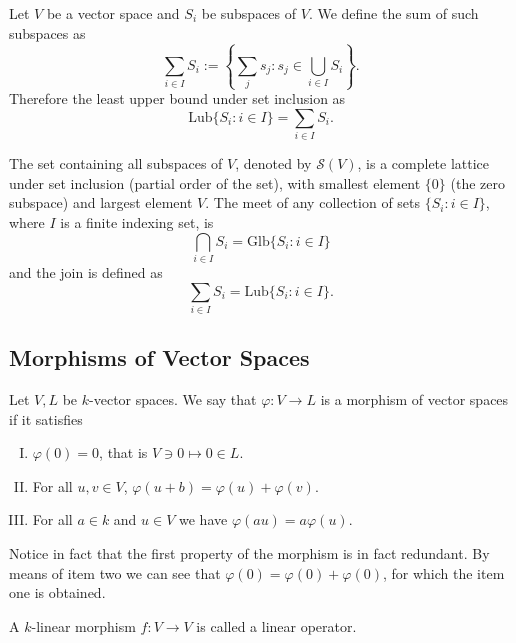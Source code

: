 \begin{definition}\label{def: sum of subspaces}
   Let \(V\) be a vector space and \(S_i\) be subspaces of \(V\). We define the
   sum of such subspaces as
   \[
      \sum_{i \in I} S_i := \left\{\sum_j s_j : s_j \in \bigcup_{i \in  I}
      S_i\right\}.
   \]
   Therefore the least upper bound under set inclusion as
   \[
      \mathrm{Lub}\{S_i : i \in I\} = \sum_{i \in I} S_i.
   \]
\end{definition}

\begin{theorem}\label{thm: subspaces form a lattice}
   The set containing all subspaces of \(V\), denoted by \(\mathcal{S}(V)\), is
   a complete lattice under set inclusion (partial order of the set), with
   smallest element \(\{0\}\) (the zero subspace) and largest element \(V\). The
   meet of any collection of sets \(\{S_i : i \in I\}\), where \(I\) is a finite
   indexing set, is
   \[
      \bigcap_{i \in  I} S_i = \mathrm{Glb}\{S_i : i \in I\}
   \]
   and the join is defined as
   \[
      \sum_{i \in I} S_i = \mathrm{Lub}\{S_i : i \in I\}.
   \]
\end{theorem}

\subsection{Morphisms of Vector Spaces}

\begin{definition}[Morphisms]\label{def: k-linear morphism}
   Let \(V, L\) be \(k\)-vector spaces. We say that \(\varphi : V \to L\) is a
   morphism of vector spaces if it satisfies
   \begin{enumerate}[I.]
      \item \(\varphi(0) = 0\), that is \(V \ni 0 \mapsto 0 \in L\).
      \item For all \(u, v \in V\), \(\varphi(u + b) = \varphi(u) +
         \varphi(v)\).
      \item For all \(a \in k\) and \(u \in V\) we have \(\varphi(au) =
         a\varphi(u)\).
   \end{enumerate}
\end{definition}

Notice in fact that the first property of the morphism is in fact redundant. By
means of item two we can see that \(\varphi(0) = \varphi(0) + \varphi(0)\), for
which the item one is obtained.

\begin{definition}\label{def: linear operator}
  A \(k\)-linear morphism \(f : V \to V\) is called a linear operator.
\end{definition}

